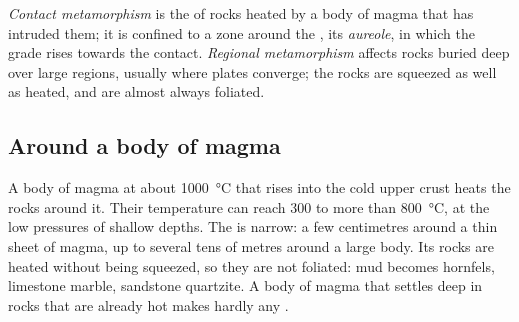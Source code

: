 \begin{definition}\label{def:g12:metamorphic-rocks:contact-regional}
\emph{Contact metamorphism} is the 
of rocks heated by a body of magma that has intruded them; it is confined to
a zone around the , its \emph{aureole}, in which the
grade rises towards the contact. \emph{Regional
metamorphism} affects rocks buried deep over
large regions, usually where plates converge; the rocks are squeezed as well
as heated, and are almost always foliated.
\end{definition}

\subsection{Around a body of magma}

A body of magma at about \qty{1000}{\celsius} that rises into the cold upper
crust heats the rocks around it. Their temperature can reach 300 to more
than \qty{800}{\celsius}, at the low pressures of shallow depths. The
 is narrow: a few centimetres around a thin sheet of magma, up to
several tens of metres around a large body. Its rocks are heated without
being squeezed, so they are not foliated: mud becomes hornfels, limestone
marble, sandstone quartzite. A body of magma that settles deep in rocks that
are already hot makes hardly any .


